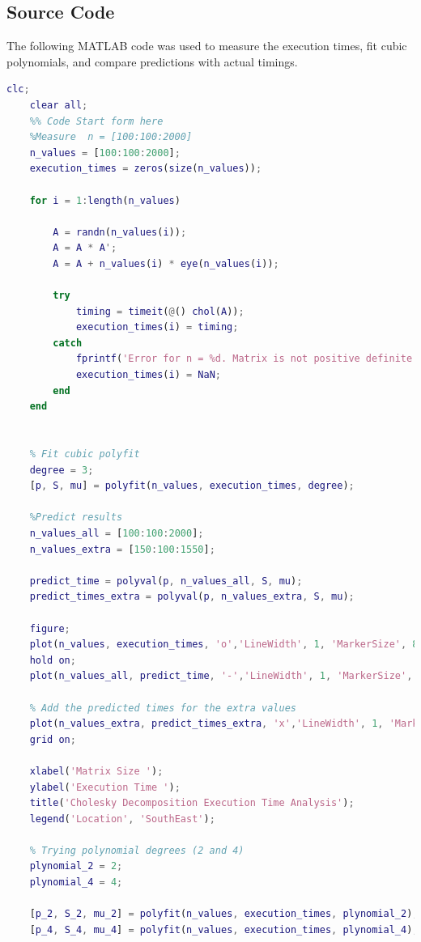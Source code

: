 \subsection*{Source Code}
The following MATLAB code was used to measure the execution times, fit cubic polynomials, and compare predictions with actual timings.
\begin{center}
    \begin{lstlisting}[language=MATLAB, caption=Time Analysis Source Code]
    clc;
    clear all;
    %% Code Start form here
    %Measure  n = [100:100:2000]
    n_values = [100:100:2000];
    execution_times = zeros(size(n_values));
   
    for i = 1:length(n_values)
        
        A = randn(n_values(i));
        A = A * A'; 
        A = A + n_values(i) * eye(n_values(i)); 

        try
            timing = timeit(@() chol(A));
            execution_times(i) = timing;
        catch
            fprintf('Error for n = %d. Matrix is not positive definite.\n', n_values(i));
            execution_times(i) = NaN; 
        end
    end

    
    % Fit cubic polyfit
    degree = 3;
    [p, S, mu] = polyfit(n_values, execution_times, degree);

    %Predict results
    n_values_all = [100:100:2000];
    n_values_extra = [150:100:1550];

    predict_time = polyval(p, n_values_all, S, mu);
    predict_times_extra = polyval(p, n_values_extra, S, mu);

    figure;
    plot(n_values, execution_times, 'o','LineWidth', 1, 'MarkerSize', 8, 'Color', 'red', 'DisplayName', 'Measured Times');
    hold on;
    plot(n_values_all, predict_time, '-','LineWidth', 1, 'MarkerSize', 8, 'Color', 'green', 'DisplayName', 'Cubic Fit');

    % Add the predicted times for the extra values 
    plot(n_values_extra, predict_times_extra, 'x','LineWidth', 1, 'MarkerSize', 8, 'Color', 'blue', 'DisplayName', 'Predicted Times (Extra)');
    grid on;

    xlabel('Matrix Size ');
    ylabel('Execution Time ');
    title('Cholesky Decomposition Execution Time Analysis');
    legend('Location', 'SouthEast');

    % Trying polynomial degrees (2 and 4)
    plynomial_2 = 2;
    plynomial_4 = 4;

    [p_2, S_2, mu_2] = polyfit(n_values, execution_times, plynomial_2);
    [p_4, S_4, mu_4] = polyfit(n_values, execution_times, plynomial_4);


\end{lstlisting}
\end{center}
